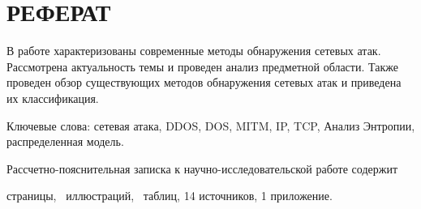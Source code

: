 \chapter*{РЕФЕРАТ}

В работе характеризованы современные методы обнаружения сетевых атак. Рассмотрена актуальность темы и проведен анализ предметной области. Также проведен обзор существующих методов обнаружения сетевых атак и приведена их классификация.

Ключевые слова: сетевая атака, DDOS, DOS, MITM, IP, TCP, Анализ Энтропии, распределенная модель.

Рассчетно-пояснительная записка к научно-исследовательской работе содержит \begin{NoHyper}\pageref{LastPage}\end{NoHyper} страницы, \totfig~иллюстраций, \tottab~таблиц, 14 источников, 1 приложение. %

